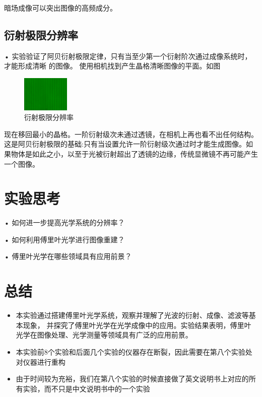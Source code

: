 \documentclass{ctexart}
\begin{document}
暗场成像可以突出图像的高频成分。

\subsection{衍射极限分辨率}
• 实验验证了阿贝衍射极限定律，只有当至少第一个衍射阶次通过成像系统时，才能形成清晰
的图像。
使用相机找到产生晶格清晰图像的平面。如图
\begin{figure}[htbp]
  \centering
  \includegraphics[width=0.2\textwidth,height=0.3\textwidth]{pictures/F2-mask-Ex8.png}
  \caption{衍射极限分辨率}
\end{figure} 


现在移回最小的晶格。一阶衍射级次未通过透镜，在相机上再也看不出任何结构。
这是阿贝衍射极限的基础:只有当设置允许一阶衍射级次通过时才能生成图像。如
果物体是如此之小，以至于光被衍射超出了透镜的边缘，传统显微镜不再可能产生
一个图像。

\section{实验思考}
• 如何进一步提高光学系统的分辨率？

• 如何利用傅里叶光学进行图像重建？

• 傅里叶光学在哪些领域具有应用前景？

\section{总结}
\begin{itemize}
  \item 本实验通过搭建傅里叶光学系统，观察并理解了光波的衍射、成像、滤波等基本现象，
  并探究了傅里叶光学在光学成像中的应用。实验结果表明，傅里叶光学在图像处理、光学测量等领域具有广泛的应用前景。
  \item 本实验前8个实验和后面几个实验的仪器存在断裂，因此需要在第八个实验处对仪器进行重构
  \item 由于时间较为充裕，我们在第八个实验的时候直接做了英文说明书上对应的所有实验，而不只是中文说明书中的一个实验
\end{itemize}
\end{document}
